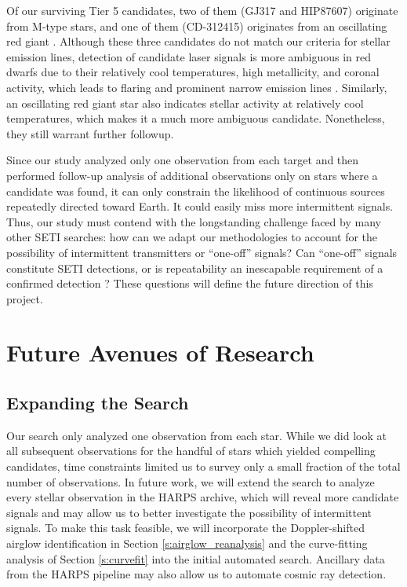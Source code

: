 \documentclass[twocolumn]{aastex701}
\begin{document}
Of our surviving Tier 5 candidates, two of them (GJ317 and HIP87607) originate from M-type stars, and one of them (CD-312415) originates from an oscillating red giant \citep{CD-312415_RED_GIANT}. Although these three candidates do not match our criteria for stellar emission lines, detection of candidate laser signals is more ambiguous in red dwarfs due to their relatively cool temperatures, high metallicity, and coronal activity, which leads to flaring and prominent narrow emission lines \citep{Marcy_2021}. Similarly, an oscillating red giant star also indicates stellar activity at relatively cool temperatures, which makes it a much more ambiguous candidate. Nonetheless, they still warrant further followup. 

Since our study analyzed only one observation from each target and then performed follow-up analysis of additional observations only on stars where a candidate was found, it can only constrain the likelihood of continuous sources repeatedly directed toward Earth.  It could easily miss more intermittent signals. Thus, our study must contend with the longstanding challenge faced by many other SETI searches: how can we adapt our methodologies to account for the possibility of intermittent transmitters or ``one-off'' signals?  Can ``one-off'' signals constitute SETI detections, or is repeatability an inescapable requirement of a confirmed detection \citep{2019nasatechnosignatures, Wow!Signal}? These questions will define the future direction of this project.


\section{Future Avenues of Research}
\subsection{Expanding the Search}
Our search only analyzed one observation from each star. While we did look at all subsequent observations for the handful of stars which yielded compelling candidates, time constraints limited us to survey only a small fraction of the total number of observations.  In future work, we will extend the search to analyze every stellar observation in the HARPS archive, which will reveal more candidate signals and may allow us to better investigate the possibility of intermittent signals. To make this task feasible, we will incorporate the Doppler-shifted airglow identification in Section \ref{s:airglow_reanalysis} and the curve-fitting analysis of Section \ref{s:curvefit} into the initial automated search. Ancillary data from the HARPS pipeline may also allow us to automate cosmic ray detection.
\end{document}

